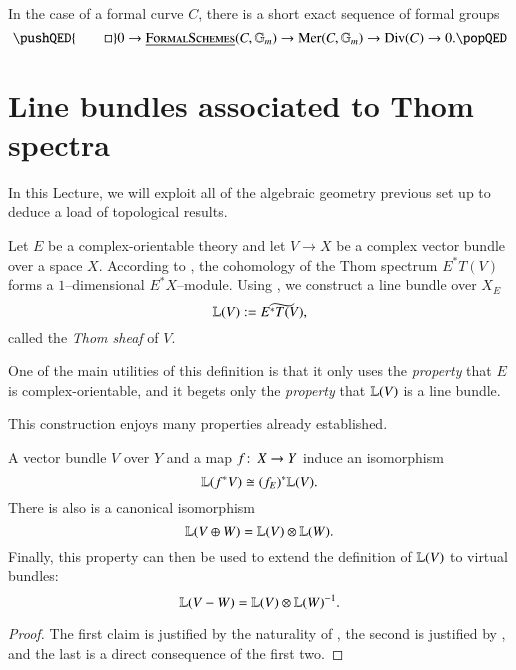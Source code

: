 \begin{theorem}
In the case of a formal curve $C$, there is a short exact sequence of formal groups
\[\pushQED{\qed}
0 \to \InternalHom{FormalSchemes}(C, \mathbb G_m) \to \operatorname{Mer}(C, \mathbb G_m) \to \Div(C) \to 0. \qedhere
\popQED\]
\end{theorem}











\section{Line bundles associated to Thom spectra}\label{ProjectivizationLecture}

In this Lecture, we will exploit all of the algebraic geometry previous set up to deduce a load of topological results.

\begin{definition}\label{DefnThomSheaf}
Let $E$ be a complex-orientable theory and let $V \to X$ be a complex vector bundle over a space $X$.  According to , the cohomology of the Thom spectrum $E^* T(V)$ forms a $1$--dimensional $E^* X$--module.  Using , we construct a line bundle over $X_E$ \[\mathbb{L}(V) := \widetilde{E^* T(V)},\] called the \textit{Thom sheaf} of $V$.
\end{definition}

\begin{remark}
One of the main utilities of this definition is that it only uses the \emph{property} that $E$ is complex-orientable, and it begets only the \emph{property} that $\mathbb{L}(V)$ is a line bundle.
\end{remark}

This construction enjoys many properties already established.
\begin{corollary}\label{PropertiesOfThomSheaves}
A vector bundle $V$ over $Y$ and a map $f \colon\thinspace X \to Y$ induce an isomorphism \[\mathbb{L}(f^* V) \cong (f_E)^* \mathbb{L}(V).\]  There is also is a canonical isomorphism \[\mathbb{L}(V \oplus W) = \mathbb{L}(V) \otimes \mathbb{L}(W).\]  Finally, this property can then be used to extend the definition of $\mathbb{L}(V)$ to virtual bundles: \[\mathbb{L}(V - W) = \mathbb{L}(V) \otimes \mathbb{L}(W)^{-1}.\]
\end{corollary}
\begin{proof}
The first claim is justified by the naturality of , the second is justified by , and the last is a direct consequence of the first two.
\end{proof}

